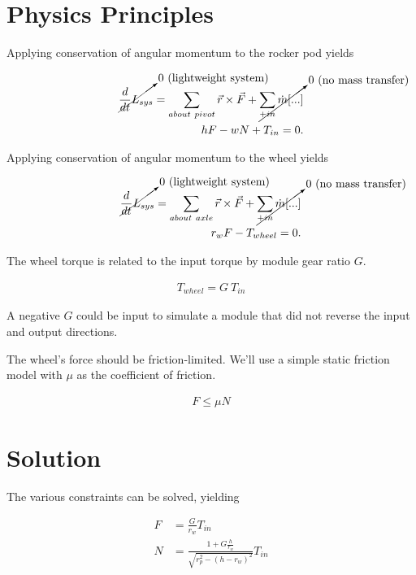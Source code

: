 \documentclass[10pt,letterpaper]{article}
\begin{document}
\section*{Physics Principles}

Applying conservation of angular momentum to the rocker pod yields

\begin{align}
	\cancelto{\mbox{0 (lightweight system)}}{\frac{d}{dt} L_{sys}} = \sum_{about\ pivot} \vec{r} \times \vec{F} + \cancelto{\mbox{0 (no mass transfer)}}{\sum_{+in} \dot{m} [...]} \nonumber \\
	h F - w N + T_{in} = 0 .
\end{align}

Applying conservation of angular momentum to the wheel yields

\begin{align}
	\cancelto{\mbox{0 (lightweight system)}}{\frac{d}{dt} L_{sys}} = \sum_{about\ axle} \vec{r} \times \vec{F} + \cancelto{\mbox{0 (no mass transfer)}}{\sum_{+in} \dot{m} [...]} \nonumber \\
	r_{w} F - T_{wheel} = 0 .
\end{align}

The wheel torque is related to the input torque by module gear ratio $G$.

\begin{align}
	T_{wheel} = G \ T_{in}
\end{align}

A negative $G$ could be input to simulate a module that did not reverse the input and output directions.

The wheel's force should be friction-limited. We'll use a simple static friction model with $\mu$ as the coefficient of friction.

\begin{align}
	F \leq \mu N	
\end{align}

\section*{Solution}

The various constraints can be solved, yielding

\begin{align}
	F &= \frac{G}{r_{w}} T_{in} \\
	N &= \frac{1 + G \frac{h}{r_{w}}}{\sqrt{r_{p}^2 - (h - r_{w})^2}} T_{in}
\end{align}
\end{document}

